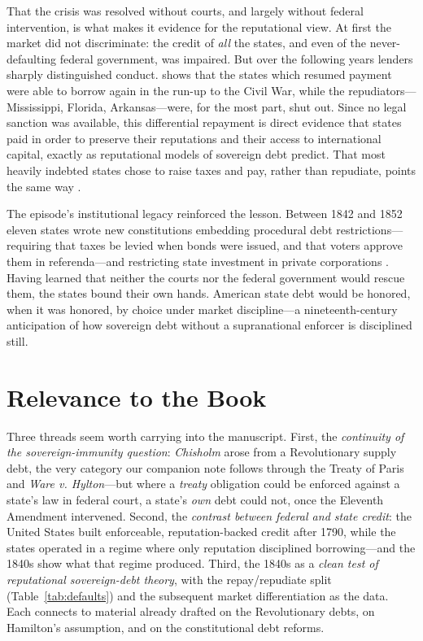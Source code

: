 \documentclass[12pt]{article}
\begin{document}
That the crisis was resolved without courts, and largely without federal
intervention, is what makes it evidence for the reputational view. At first the
market did not discriminate: the credit of \emph{all} the states, and even of the
never-defaulting federal government, was impaired. But over the following years
lenders sharply distinguished conduct. \citet{english1996understanding} shows that
the states which resumed payment were able to borrow again in the run-up to the
Civil War, while the repudiators---Mississippi, Florida, Arkansas---were, for the
most part, shut out. Since no legal sanction was available, this differential
repayment is direct evidence that states paid in order to preserve their
reputations and their access to international capital, exactly as reputational
models of sovereign debt predict. That most heavily indebted states chose to raise
taxes and pay, rather than repudiate, points the same way
\citep{english1996understanding, wallis2004sovereign}.

The episode's institutional legacy reinforced the lesson. Between 1842 and 1852
eleven states wrote new constitutions embedding procedural debt restrictions---
requiring that taxes be levied when bonds were issued, and that voters approve them
in referenda---and restricting state investment in private corporations
\citep{wallis2005constitutions}. Having learned that neither the courts nor the
federal government would rescue them, the states bound their own hands. American
state debt would be honored, when it was honored, by choice under market
discipline---a nineteenth-century anticipation of how sovereign debt without a
supranational enforcer is disciplined still.

\section{Relevance to the Book}
\label{sec:relevance}

Three threads seem worth carrying into the manuscript. First, the \emph{continuity
of the sovereign-immunity question}: \emph{Chisholm} arose from a Revolutionary
supply debt, the very category our companion note follows through the Treaty of
Paris and \emph{Ware v. Hylton}---but where a \emph{treaty} obligation could be
enforced against a state's law in federal court, a state's \emph{own} debt could
not, once the Eleventh Amendment intervened. Second, the \emph{contrast between
federal and state credit}: the United States built enforceable, reputation-backed
credit after 1790, while the states operated in a regime where only reputation
disciplined borrowing---and the 1840s show what that regime produced. Third, the
1840s as a \emph{clean test of reputational sovereign-debt theory}, with the
repay/repudiate split (Table~\ref{tab:defaults}) and the subsequent market
differentiation as the data. Each connects to material already drafted on the
Revolutionary debts, on Hamilton's assumption, and on the constitutional debt
reforms.
\end{document}
